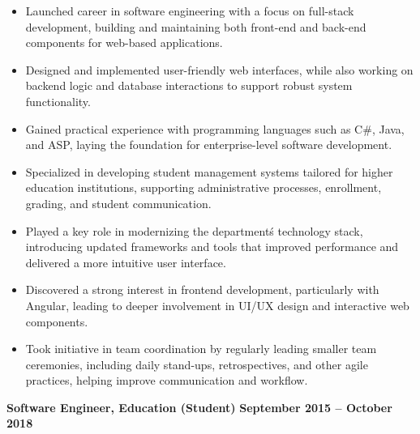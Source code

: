 \documentclass[10pt, a4paper]{cvhari}
\begin{document}
    \vspace{0.2em}
    \begin{itemize}
         
        \item Launched career in software engineering with a focus on full-stack development, building and maintaining both front-end and back-end components for web-based applications.

        \item Designed and implemented user-friendly web interfaces, while also working on backend logic and database interactions to support robust system functionality.

        \item Gained practical experience with programming languages such as C\#, Java, and ASP, laying the foundation for enterprise-level software development.

        \item Specialized in developing student management systems tailored for higher education institutions, supporting administrative processes, enrollment, grading, and student communication.

        \item Played a key role in modernizing the department\'s technology stack, introducing updated frameworks and tools that improved performance and delivered a more intuitive user interface.

        \item Discovered a strong interest in frontend development, particularly with Angular, leading to deeper involvement in UI/UX design and interactive web components.

        \item Took initiative in team coordination by regularly leading smaller team ceremonies, including daily stand-ups, retrospectives, and other agile practices, helping improve communication and workflow.

\end{itemize}

\smallskip
\divider
\smallskip

    \textbf{Software Engineer, Education (Student)} \hfill \textbf{September 2015 -- October 2018}
\end{document}
